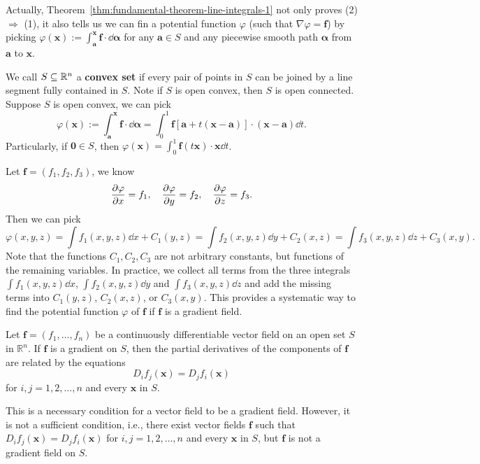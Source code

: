     \begin{remarkenv}
        Actually, Theorem~\ref{thm:fundamental-theorem-line-integrals-1} not only proves (2) $\Rightarrow$ (1), it also tells us we can fin a potential function $\varphi$ (such that $\nabla \varphi = \bm f$) by picking $\varphi (\bm x) := \displaystyle \int_{\bm a}^{\bm x} \bm f \cdot \dd \bm \alpha$ for any $\bm a\in S$ and any piecewise smooth path $\bm \alpha$ from $\bm a$ to $\bm x$.
    \end{remarkenv}
    \begin{exampleenv}
        We call $S\subseteq \mathbb{R}^n$ a \textbf{convex set} if every pair of points in $S$ can be joined by a line segment fully contained in $S$. Note if $S$ is open convex, then $S$ is open connected. Suppose $S$ is open convex, we can pick
        $$
        \varphi(\bm x) := \int_{\bm a}^{\bm x} \bm f \cdot \dd \bm \alpha = \int_0^1 \bm f[\bm a + t(\bm x - \bm a)] \cdot (\bm x - \bm a) \dd t.
        $$
        Particularly, if $\bm 0 \in S$, then $\displaystyle \varphi(\bm x) = \int_0^1 \bm f(t \bm x) \cdot \bm x \dd t$.
    \end{exampleenv}
    \begin{exampleenv}
        Let $\bm f = (f_1, f_2, f_3)$, we know
        $$ \pdv{\varphi}{x} = f_1, \quad \pdv{\varphi}{y} = f_2, \quad \pdv{\varphi}{z} = f_3. $$
        Then we can pick
        $$ \varphi(x,y,z) = \int f_1(x,y,z) \dd x + C_1(y,z) = \int f_2(x,y,z) \dd y + C_2(x,z) = \int f_3(x,y,z) \dd z + C_3(x,y). $$
        Note that the functions \(C_1, C_2, C_3\) are not arbitrary constants, but functions of the remaining variables. In practice, we collect all terms from the three integrals $\displaystyle \int f_1(x,y,z) \dd x$, $\displaystyle \int f_2(x,y,z) \dd y$ and $\displaystyle \int f_3(x,y,z) \dd z$ and add the missing terms into \(C_1(y,z)\), \(C_2(x,z)\), or \(C_3(x,y)\). This provides a systematic way to find the potential function $\varphi$ of $\bm f$ if $\bm f$ is a gradient field.
    \end{exampleenv}
    \begin{theoremenv}
        Let $\bm f=(f_1,\ldots,f_n)$ be a continuously differentiable vector field on an open set $S$ in $\mathbb R^n$. If $\bm f$ is a gradient on $S$, then the partial derivatives of the components of $\bm f$ are related by the equations
        \[
        D_i f_j(\bm x)=D_j f_i(\bm x)
        \]
        for $i,j=1,2,\ldots,n$ and every $\bm x$ in $S$.
    \end{theoremenv}
    \begin{remarkenv}
        This is a necessary condition for a vector field to be a gradient field. However, it is not a sufficient condition, i.e., there exist vector fields $\bm f$ such that $D_i f_j(\bm x)=D_j f_i(\bm x)$ for $i,j=1,2,\ldots,n$ and every $\bm x$ in $S$, but $\bm f$ is not a gradient field on $S$.  
    \end{remarkenv}
